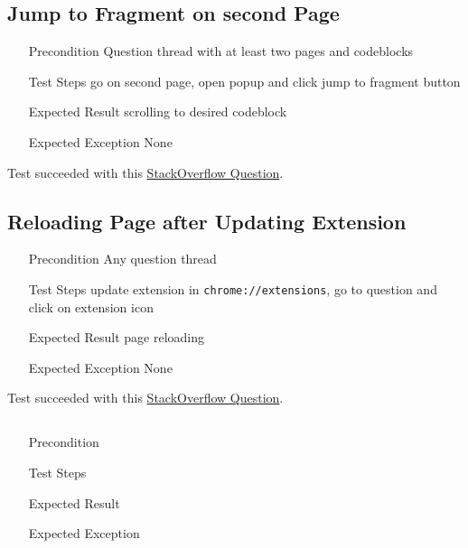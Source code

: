 \documentclass{report}
\begin{document}
\subsection*{Jump to Fragment on second Page}
\begin{itemize}
	\item[Precondition] Question thread with at least two pages and codeblocks
	\item[Test Steps] go on second page, open popup and click jump to fragment button
	\item[Expected Result] scrolling to desired codeblock
	\item[Expected Exception] None
\end{itemize}
Test succeeded with this \href{https://stackoverflow.com/questions/221294/how-do-you-get-a-timestamp-in-javascript?page=2}{StackOverflow Question}. 

\subsection*{Reloading Page after Updating Extension}
\begin{itemize}
	\item[Precondition] Any question thread
	\item[Test Steps] update extension in \texttt{chrome://extensions}, go to question and click on extension icon
	\item[Expected Result] page reloading
	\item[Expected Exception] None
\end{itemize}
Test succeeded with this \href{https://stackoverflow.com/questions/221294/how-do-you-get-a-timestamp-in-javascript?rq=1}{StackOverflow Question}.

\subsection*{}
\begin{itemize}
	\item[Precondition]
	\item[Test Steps]
	\item[Expected Result]
	\item[Expected Exception]
\end{itemize}
\end{document}
